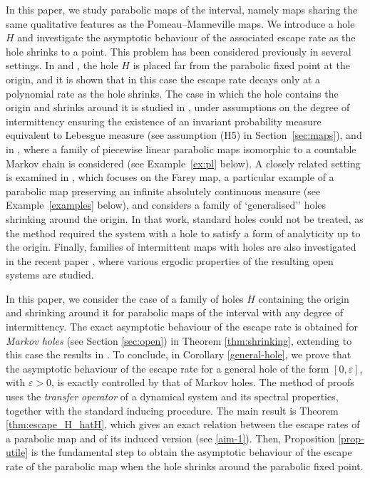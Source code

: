 \documentclass{amsart}
\theoremstyle{definition}
\theoremstyle{remark}
\theoremstyle{definition}
\numberwithin{equation}{section}
\newcommand{\eps}{\varepsilon}
\begin{document}
In this paper, we study parabolic maps of the interval, namely maps sharing the same qualitative features as the Pomeau–Manneville maps. We introduce a hole $H$ and investigate the asymptotic behaviour of the associated escape rate as the hole shrinks to a point. This problem has been considered previously in several settings. In \cite{DF} and \cite{DT}, the hole $H$ is placed far from the parabolic fixed point at the origin, and it is shown that in this case the escape rate decays only at a polynomial rate as the hole shrinks. The case in which the hole contains the origin and shrinks around it is studied in \cite{FMS11}, under assumptions on the degree of intermittency ensuring the existence of an invariant probability measure equivalent to Lebesgue measure (see assumption (H5) in Section~\ref{sec:maps}), and in \cite{MK}, where a family of piecewise linear parabolic maps isomorphic to a countable Markov chain is considered (see Example~\ref{ex:pl} below). A closely related setting is examined in \cite{BC}, which focuses on the Farey map, a particular example of a parabolic map preserving an infinite absolutely continuous measure (see Example~\ref{examples} below), and considers a family of `generalised'' holes shrinking around the origin. In that work, standard holes could not be treated, as the method required the system with a hole to satisfy a form of analyticity up to the origin. Finally, families of intermittent maps with holes are also investigated in the recent paper \cite{BK}, where various ergodic properties of the resulting open systems are studied.

In this paper, we consider the case of a family of holes $H$ containing the origin and shrinking around it for parabolic maps of the interval with any degree of intermittency. The exact asymptotic behaviour of the escape rate is obtained for \emph{Markov holes} (see Section \ref{sec:open}) in Theorem \ref{thm:shrinking}, extending to this case the results in \cite{MK,BC}. To conclude, in Corollary \ref{general-hole}, we prove that the asymptotic behaviour of the escape rate for a general hole of the form $[0,\eps]$, with $\eps>0$, is exactly controlled by that of Markov holes. The method of proofs uses the \emph{transfer operator} of a dynamical system and its spectral properties, together with the standard inducing procedure. The main result is Theorem \ref{thm:escape_H_hatH}, which gives an exact relation between the escape rates of a parabolic map and of its induced version (see \eqref{aim-1}). Then, Proposition \ref{prop-utile} is the fundamental step to obtain the asymptotic behaviour of the escape rate of the parabolic map when the hole shrinks around the parabolic fixed point.
\end{document}
